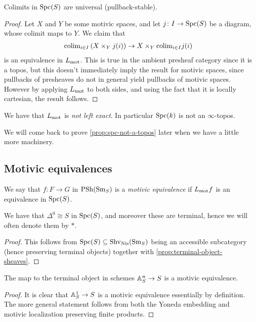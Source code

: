 \documentclass[11pt]{amsart}
\begin{document}
\begin{corollary}\label{cor:universal-colimits-motivic-spaces}
Colimits in $\mathrm{Spc}(S)$ are universal (pullback-stable). 
\end{corollary}
\begin{proof} Let $X$ and $Y$ be some motivic spaces, and let $j \colon I \to \mathrm{Spc}(S)$ be a diagram, whose colimit maps to $Y$. We claim that
\begin{align*}
    \mathrm{colim}_{i\in I} \left( X \times_Y j(i) \right) \to X \times_Y \mathrm{colim}_{i\in I} j(i)
\end{align*}
is an equivalence in $L_{\mathrm{mot}}$. This is true in the ambient presheaf category since it is a topos, but this doesn't immediately imply the result for motivic spaces, since pullbacks of presheaves do not in general yield pullbacks of motivic spaces. However by applying $L_{\mathrm{mot}}$ to both sides, and using the fact that it is locally cartesian, the result follows.
\end{proof}


\begin{proposition}\label{prop:spc-not-a-topos} 
We have that $L_{\mathrm{mot}}$ is \textit{not left exact}. In particular $\mathrm{Spc}(k)$ is not an $\infty$-topos.
\end{proposition}
We will come back to prove \autoref{prop:spc-not-a-topos} later when we have a little more machinery.

\subsection{Motivic equivalences}


\begin{definition} We say that $f \colon F \to G$ in $\mathrm{PSh}(\mathrm{Sm}_S)$ is a \textit{motivic equivalence} if $L_{\mathrm{mot}} f$ is an equivalence in $\mathrm{Spc}(S)$.
\end{definition}

\begin{proposition}\label{prop:terminal-object-motivic-spaces} 
We have that $\Delta^0 \cong S$ in $\mathrm{Spc}(S)$, and moreover these are terminal, hence we will often denote them by $\ast$.
\end{proposition}
\begin{proof} This follows from $\mathrm{Spc}(S) \subseteq \mathrm{Shv}_{\mathrm{Nis}}(\mathrm{Sm}_S)$ being an accessible subcategory (hence preserving terminal objects) together with \autoref{prop:terminal-object-sheaves}.
\end{proof}

\begin{proposition} The map to the terminal object in schemes $\mathbb{A}^n_S \to S$ is a motivic equivalence.
\end{proposition}
\begin{proof} It is clear that $\mathbb{A}^1_S \to S$ is a motivic equivalence essentially by definition. The more general statement follows from both the Yoneda embedding and motivic localization preserving finite products.
\end{proof}
\end{document}
